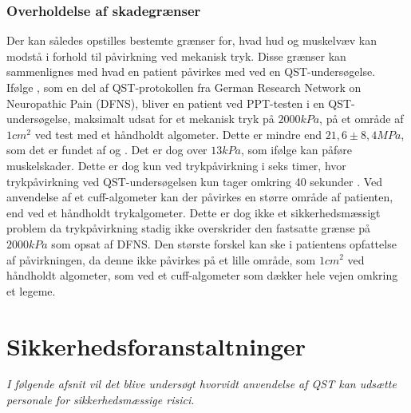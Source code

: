 \subsubsection{Overholdelse af skadegrænser}
Der kan således opstilles bestemte grænser for, hvad hud og muskelvæv kan modstå i forhold til påvirkning ved mekanisk tryk. Disse grænser kan sammenlignes med hvad en patient påvirkes med ved en QST-undersøgelse. \\
Ifølge , som en del af QST-protokollen fra German Research Network on Neuropathic Pain (DFNS), bliver en patient ved PPT-testen i en QST-undersøgelse, maksimalt udsat for et mekanisk tryk på $2000 kPa$, på et område af $1 cm^{2}$ ved test med et håndholdt algometer. Dette er mindre end $21,6 \pm 8,4 MPa$, som det er fundet af  og . Det er dog over $13 kPa$, som ifølge  kan påføre muskelskader. Dette er dog kun ved trykpåvirkning i seks timer, hvor trykpåvirkning ved QST-undersøgelsen kun tager omkring 40 sekunder \cite{rolke2006}. Ved anvendelse af et cuff-algometer kan der påvirkes en større område af patienten, end ved et håndholdt trykalgometer. Dette er dog ikke et sikkerhedsmæssigt problem da trykpåvirkning stadig ikke overskrider den fastsatte grænse på $2000 kPa$ som opsat af DFNS. Den største forskel kan ske i patientens opfattelse af påvirkningen, da denne ikke påvirkes på et lille område, som $1 cm^{2}$ ved håndholdt algometer, som ved et cuff-algometer som dækker hele vejen omkring et legeme. %



\section{Sikkerhedsforanstaltninger}
\textit{I følgende afsnit vil det blive undersøgt hvorvidt anvendelse af QST kan udsætte personale for sikkerhedsmæssige risici.}

